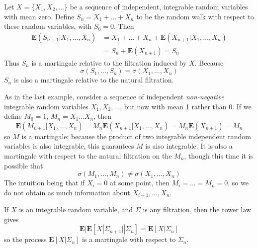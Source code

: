 \begin{example}
    Let $X = \{ X_1, X_2, \dots \}$ be a sequence of independent, integrable random variables with mean zero. Define $S_n = X_1 + \dots + X_n$ to be the random walk with respect to these random variables, with $S_0 = 0$. Then
    \begin{align*}
        \mathbf{E}(S_{n+1}|X_1, \dots, X_n) &= X_1 + \dots + X_n + \mathbf{E}(X_{n+1}|X_1, \dots, X_n)\\
        &= S_n + \mathbf{E}(X_{n+1}) = S_n
    \end{align*}
    Thus $S_n$ is a martingale relative to the filtration induced by $X$. Because
    \[ \sigma(S_1, \dots, S_n) = \sigma(X_1, \dots, X_n) \]
    $S_n$ is also a martingale relative to the natural filtration.
\end{example}

\begin{example}
    As in the last example, consider a sequence of independent {\it non-negative} integrable random variables $X_1, X_2, \dots$, but now with mean 1 rather than 0. If we define $M_0 = 1$, $M_n = X_1 \dots X_n$, then
    \[ \mathbf{E}(M_{n+1}|X_1, \dots, X_n) = M_n \mathbf{E}(X_{n+1}|X_1, \dots, X_n) = M_n \mathbf{E}(X_{n+1}) = M_n \]
    so $M$ is a martingale; because the product of two integrable independent random variables is also integrable, this guarantees $M$ is also integrable. It is also a martingale with respect to the natural filtration on the $M_n$, though this time it is possible that
    \[ \sigma(M_1, \dots, M_n) \neq \sigma(X_1, \dots, X_n) \]
    The intuition being that if $X_i = 0$ at some point, then $M_i = \dots = M_n = 0$, so we do not obtain as much information about $X_{i+1}, \dots, X_n$.
\end{example}

\begin{example}
    If $X$ is an integrable random variable, and $\Sigma$ is any filtration, then the tower law gives
    \[ \mathbf{E}[\mathbf{E}[X|\Sigma_{n+1}]|\Sigma_n] = \mathbf{E}[X|\Sigma_n] \]
    so the process $\mathbf{E}[X|\Sigma_n]$ is a martingale with respect to $\Sigma_n$.
\end{example}

